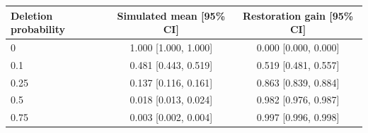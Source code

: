 \begin{tabular}{lcc}\toprule
Deletion probability & Simulated mean [95\% CI] & Restoration gain [95\% CI] \\ \midrule
0 & 1.000 [1.000, 1.000] & 0.000 [0.000, 0.000] \\
0.1 & 0.481 [0.443, 0.519] & 0.519 [0.481, 0.557] \\
0.25 & 0.137 [0.116, 0.161] & 0.863 [0.839, 0.884] \\
0.5 & 0.018 [0.013, 0.024] & 0.982 [0.976, 0.987] \\
0.75 & 0.003 [0.002, 0.004] & 0.997 [0.996, 0.998] \\ \bottomrule\end{tabular}
